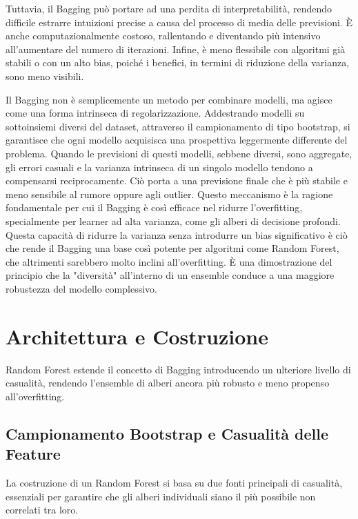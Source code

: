 \documentclass[a4paper,12pt]{report}
\begin{document}
	Tuttavia, il Bagging può portare ad una perdita di interpretabilità, rendendo difficile estrarre intuizioni precise a causa del processo di media delle previsioni. È anche computazionalmente costoso, rallentando e diventando più intensivo all'aumentare del numero di iterazioni. Infine, è meno flessibile con algoritmi già stabili o con un alto bias, poiché i benefici, in termini di riduzione della varianza, sono meno visibili.
	
	Il Bagging non è semplicemente un metodo per combinare modelli, ma agisce come una forma intrinseca di regolarizzazione. Addestrando modelli su sottoinsiemi diversi del dataset, attraverso il campionamento di tipo bootstrap, si garantisce che ogni modello acquisisca una prospettiva leggermente differente del problema. Quando le previsioni di questi modelli, sebbene diversi, sono aggregate, gli errori casuali e la varianza intrinseca di un singolo modello tendono a compensarsi reciprocamente. Ciò porta a una previsione finale che è più stabile e meno sensibile al rumore oppure agli outlier. Questo meccanismo è la ragione fondamentale per cui il Bagging è così efficace nel ridurre l'overfitting, specialmente per learner ad alta varianza, come gli alberi di decisione profondi. Questa capacità di ridurre la varianza senza introdurre un bias significativo è ciò che rende il Bagging una base così potente per algoritmi come Random Forest, che altrimenti sarebbero molto inclini all'overfitting. È una dimostrazione del principio che la "diversità" all'interno di un ensemble conduce a una maggiore robustezza del modello complessivo.
	
	\section{Architettura e Costruzione}
	
	Random Forest estende il concetto di Bagging introducendo un ulteriore livello di casualità, rendendo l'ensemble di alberi ancora più robusto e meno propenso all'overfitting.
	
	\subsection{Campionamento Bootstrap e Casualità delle Feature}
	
	La costruzione di un Random Forest si basa su due fonti principali di casualità, essenziali per garantire che gli alberi individuali siano il più possibile non correlati tra loro.
	
\end{document}
